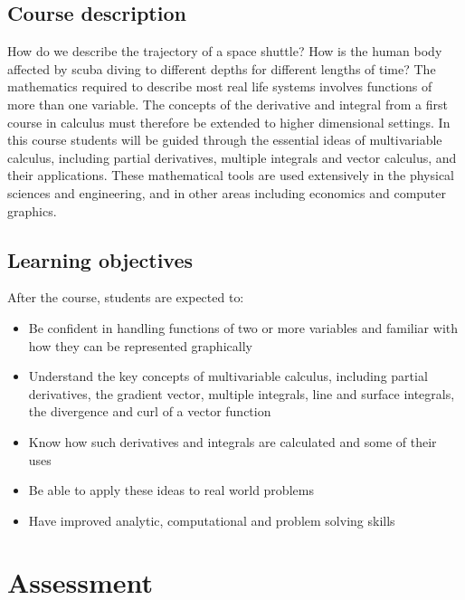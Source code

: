 \documentclass[
]{book}
\theoremstyle{definition}
\theoremstyle{definition}
\theoremstyle{definition}
\theoremstyle{definition}
\theoremstyle{remark}
\begin{document}
\hypertarget{course-description}{%
\subsection*{Course description}\label{course-description}}

How do we describe the trajectory of a space shuttle? How is the human body affected by
scuba diving to different depths for different lengths of time? The mathematics required to
describe most real life systems involves functions of more than one variable. The concepts
of the derivative and integral from a first course in calculus must therefore be extended to
higher dimensional settings. In this course students will be guided through the essential ideas
of multivariable calculus, including partial derivatives, multiple integrals and vector calculus,
and their applications. These mathematical tools are used extensively in the physical sciences
and engineering, and in other areas including economics and computer graphics.

\hypertarget{learning-objectives}{%
\subsection*{Learning objectives}\label{learning-objectives}}

After the course, students are expected to:

\begin{itemize}
\item
  Be confident in handling functions of two or more variables and familiar with how
  they can be represented graphically
\item
  Understand the key concepts of multivariable calculus, including partial derivatives,
  the gradient vector, multiple integrals, line and surface integrals, the divergence and
  curl of a vector function
\item
  Know how such derivatives and integrals are calculated and some of their uses
\item
  Be able to apply these ideas to real world problems
\item
  Have improved analytic, computational and problem solving skills
\end{itemize}

\hypertarget{assessment}{%
\section*{Assessment}\label{assessment}}
\end{document}
